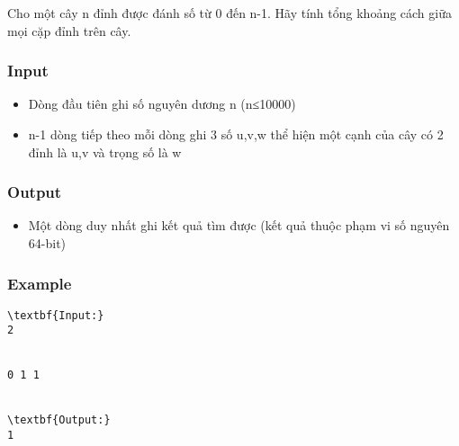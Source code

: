 



   Cho một cây n đỉnh được đánh số từ 0 đến n-1. Hãy tính tổng khoảng cách giữa mọi cặp đỉnh trên cây.  

\subsubsection{   Input  }
\begin{itemize}
	\item     Dòng đầu tiên ghi số nguyên dương n (n≤10000)   
	\item     n-1 dòng tiếp theo mỗi dòng ghi 3 số u,v,w thể hiện một cạnh của cây có 2 đỉnh là u,v và trọng số là w   
\end{itemize}

\subsubsection{   Output  }
\begin{itemize}
	\item     Một dòng duy nhất ghi kết quả tìm được (kết quả thuộc phạm vi số nguyên 64-bit)   
\end{itemize}

\subsubsection{   Example  }
\begin{verbatim}
\textbf{Input:}
2


0 1 1


\textbf{Output:}
1\end{verbatim}
